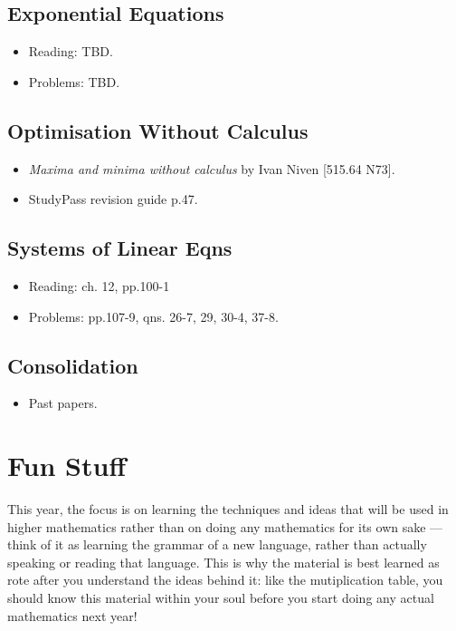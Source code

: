 \documentclass[a4paper]{amsart}
\theoremstyle{definition}
\theoremstyle{remark}
\begin{document}
  \subsection{Exponential Equations}
  \begin{itemize}
    \item Reading: TBD.
    \item Problems: TBD.
  \end{itemize}

  \subsection{Optimisation Without Calculus}
  \begin{itemize}
    \item \textit{Maxima and minima without calculus} by Ivan Niven [515.64 N73].
    \item StudyPass revision guide p.47.
  \end{itemize}

  \subsection{Systems of Linear Eqns}
  \begin{itemize}
    \item Reading: ch. 12, pp.100-1
    \item Problems: pp.107-9, qns. 26-7, 29, 30-4, 37-8.
  \end{itemize}

  \subsection{Consolidation}
  \begin{itemize}
    \item Past papers.
  \end{itemize}

  \section{Fun Stuff}
  This year, the focus is on learning the techniques and ideas that will be used in higher mathematics rather than on doing
  any mathematics for its own sake --- think of it as learning the grammar of a new language, rather than actually speaking
  or reading that language. This is why the material is best learned as rote after you understand the ideas behind it: like
  the mutiplication table, you should know this material within your soul before you start doing any actual mathematics next
  year!
\end{document}
